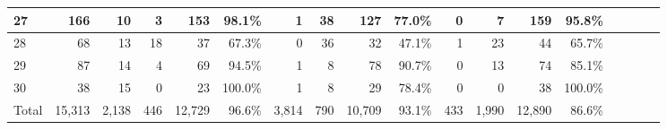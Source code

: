 \begin{table*}[t]
\begin{SmallOut}
\begin {tabular} {|l|r|r|r|r|r|r|r|r|r|r|r|r|r|r|r|r|r|}
\hline
27                        & 166  & 10  & 3  & 153 & 98.1\% & 1   & 38 & 127   & 77.0\% & 0   & 7  & 159  & 95.8\%\\
\hline
28                        & 68   & 13  & 18 & 37  & 67.3\% & 0   & 36  & 32   & 47.1\% & 1  & 23  & 44   & 65.7\%\\
\hline
29                        & 87   & 14  & 4  & 69  & 94.5\% & 1   & 8   & 78   & 90.7\% & 0  & 13  & 74   & 85.1\%\\
\hline
30                        & 38    & 15 & 0  & 23 & 100.0\% & 1   & 8   & 29   & 78.4\% & 0  & 0   & 38   & 100.0\%\\
\hline\hline
\multicolumn{1}{|c|}{Total}    &15,313 &2,138&446&12,729& 96.6\% & 3,814& 790&10,709 & 93.1\% & 433& 1,990 &12,890 & 86.6\%\\
\hline
\end{tabular}%
 \label{table:codestructure}
\end{SmallOut}%
\end{table*}


